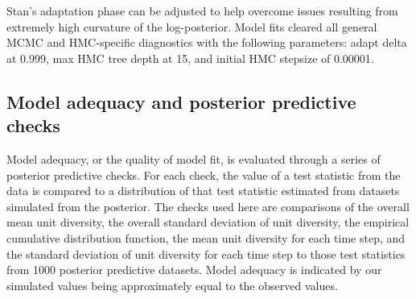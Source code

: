 \documentclass[12pt,letterpaper]{article}
\begin{document}
Stan's adaptation phase can be adjusted to help overcome issues resulting from extremely high curvature of the log-posterior. Model fits cleared all general MCMC and HMC-specific diagnostics with the following parameters: adapt delta at 0.999, max HMC tree depth at 15, and initial HMC stepsize of 0.00001. 


\subsection{Model adequacy and posterior predictive checks}

Model adequacy, or the quality of model fit, is evaluated through a series of posterior predictive checks. For each check, the value of a test statistic from the data is compared to a distribution of that test statistic estimated from datasets simulated from the posterior. The checks used here are comparisons of the overall mean unit diversity, the overall standard deviation of unit diversity, the empirical cumulative distribution function, the mean unit diversity for each time step, and the standard deviation of unit diversity for each time step to those test statistics from 1000 posterior predictive datasets. Model adequacy is indicated by our simulated values being approximately equal to the observed values.
\end{document}
